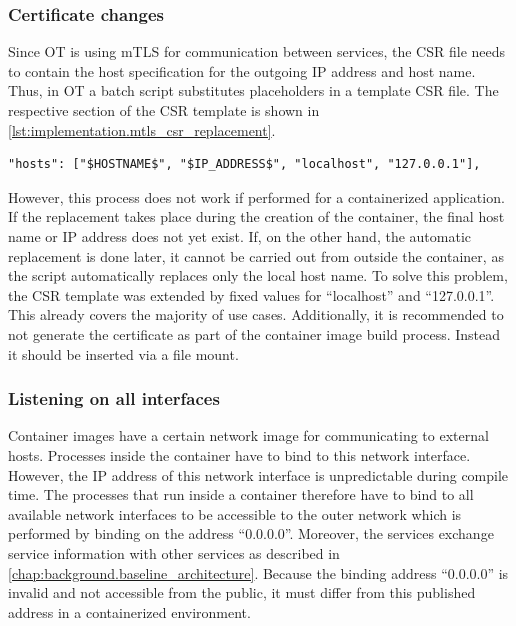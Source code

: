 \subsubsection*{Certificate changes}
Since \ac{OT} is using \ac{mTLS} for communication between services, the \ac{CSR} file needs to contain the host specification for the outgoing \ac{IP} address and host name. Thus, in \ac{OT} a batch script substitutes placeholders in a template \ac{CSR} file. The respective section of the \ac{CSR} template is shown in \autoref{lst:implementation.mtls_csr_replacement}.
\begin{lstlisting}[label=lst:implementation.mtls_csr_replacement, caption={Variables defined in the \ac{CSR} are substituted by their respective values. (\textit{/Deployment/Certificates/server-csr\_template.json})}, language={}, firstnumber=3]
  "hosts": ["$HOSTNAME$", "$IP_ADDRESS$", "localhost", "127.0.0.1"],
\end{lstlisting}
However, this process does not work if performed for a containerized application. If the replacement takes place during the creation of the container, the final host name or \ac{IP} address does not yet exist. If, on the other hand, the automatic replacement is done later, it cannot be carried out from outside the container, as the script automatically replaces only the local host name.
To solve this problem, the \ac{CSR} template was extended by fixed values for \enquote{localhost} and \enquote{127.0.0.1}. This already covers the majority of use cases. Additionally, it is recommended to not generate the certificate as part of the container image build process. Instead it should be inserted via a file mount.

\subsubsection*{Listening on all interfaces}
Container images have a certain network image for communicating to external hosts. Processes inside the container have to bind to this network interface. However, the \ac{IP} address of this network interface is unpredictable during compile time. The processes that run inside a container therefore have to bind to all available network interfaces to be accessible to the outer network which is performed by binding on the address \enquote{0.0.0.0}.
Moreover, the services exchange service information with other services as described in \autoref{chap:background.baseline_architecture}. Because the binding address \enquote{0.0.0.0} is invalid and not accessible from the public, it must differ from this published address in a containerized environment.

